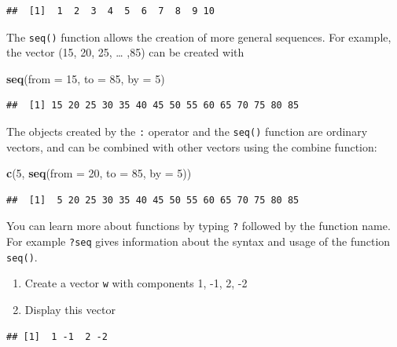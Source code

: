 \documentclass[
]{book}
\newenvironment{Shaded}{\begin{snugshade}}{\end{snugshade}}
\newcommand{\AttributeTok}[1]{\textcolor[rgb]{0.13,0.29,0.53}{#1}}
\newcommand{\DecValTok}[1]{\textcolor[rgb]{0.00,0.00,0.81}{#1}}
\newcommand{\FunctionTok}[1]{\textcolor[rgb]{0.13,0.29,0.53}{\textbf{#1}}}
\newcommand{\NormalTok}[1]{#1}
\begin{document}
\begin{verbatim}
##  [1]  1  2  3  4  5  6  7  8  9 10
\end{verbatim}

The \texttt{seq()} function allows the creation of more general
sequences. For example, the vector (15, 20, 25, \ldots{} ,85) can be created
with

\begin{Shaded}
\begin{Highlighting}[]
\FunctionTok{seq}\NormalTok{(}\AttributeTok{from =} \DecValTok{15}\NormalTok{, }\AttributeTok{to =} \DecValTok{85}\NormalTok{, }\AttributeTok{by =} \DecValTok{5}\NormalTok{)}
\end{Highlighting}
\end{Shaded}

\begin{verbatim}
##  [1] 15 20 25 30 35 40 45 50 55 60 65 70 75 80 85
\end{verbatim}

The objects created by the \texttt{:} operator and the \texttt{seq()} function
are ordinary vectors, and can be combined with other vectors using the
combine function:

\begin{Shaded}
\begin{Highlighting}[]
\FunctionTok{c}\NormalTok{(}\DecValTok{5}\NormalTok{, }\FunctionTok{seq}\NormalTok{(}\AttributeTok{from =} \DecValTok{20}\NormalTok{, }\AttributeTok{to =} \DecValTok{85}\NormalTok{, }\AttributeTok{by =} \DecValTok{5}\NormalTok{))}
\end{Highlighting}
\end{Shaded}

\begin{verbatim}
##  [1]  5 20 25 30 35 40 45 50 55 60 65 70 75 80 85
\end{verbatim}

You can learn more about functions by typing \texttt{?} followed by the
function name. For example \texttt{?seq} gives information about the
syntax and usage of the function \texttt{seq()}.

\begin{enumerate}
\def\labelenumi{\arabic{enumi}.}
\item
  Create a vector \texttt{w} with components 1, -1, 2, -2
\item
  Display this vector
\end{enumerate}

\begin{verbatim}
## [1]  1 -1  2 -2
\end{verbatim}
\end{document}
